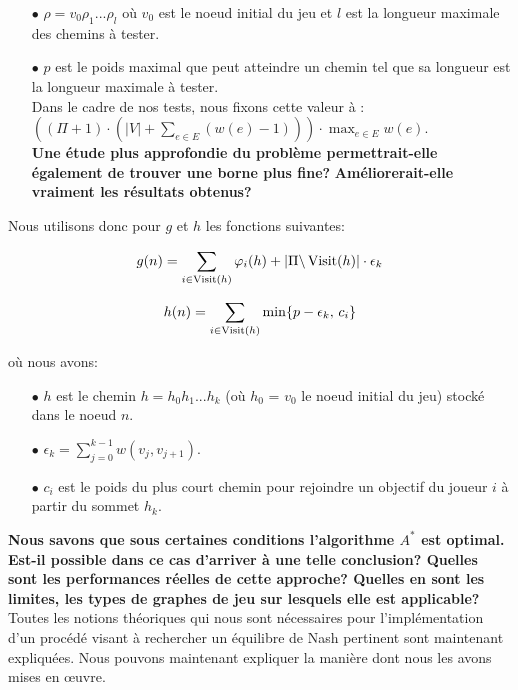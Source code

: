 \begin{itemize}
	\item[$\bullet$] $\rho = v_0 \rho_1 ... \rho_l$ où $v_0$ est le noeud initial du jeu et $l$ est la longueur maximale des chemins à tester.
	\item[$\bullet$] $p$ est le poids maximal que peut atteindre un chemin tel que sa longueur est la longueur maximale à tester.\\
	 Dans le cadre de nos tests, nous fixons cette valeur à : $((\Pi + 1) \cdot (|V| + \sum_{e \in E} (w(e) - 1)))\cdot \max_{e \in E} w(e)$.\\ \textbf{Une étude plus approfondie du problème permettrait-elle \linebreak également de trouver une borne plus fine?} \textbf{Améliorerait-elle vraiment les résultats obtenus?}\\
\end{itemize}

Nous utilisons donc pour $g$ et $h$ les fonctions suivantes:

$$ g(n) = \sum_{i \in \operatorname*{Visit}(h)} \varphi_i(h) + |\Pi\backslash \operatorname*{Visit}(h)| \cdot \epsilon_k$$



$$h(n) = \sum_{i \in \operatorname*{Visit}(h)} \min\{ p - \epsilon_k ,\, c_i \}$$


où nous avons:

\begin{itemize}
	\item[$\bullet$] $h$ est le chemin $h = h_0 h_1 ... h_k$ (où $h_0$ = $v_0$ le noeud initial du jeu) stocké dans le noeud $n$.
	\item[$\bullet$] $\displaystyle \epsilon_k = \sum_{j = 0}^{k-1} w(v_j, v_{j+1})$.
	\item[$\bullet$] $c_i$ est le poids du plus court chemin pour rejoindre un objectif du joueur $i$ à partir du sommet $h_k$.
\end{itemize}
$ $\\
\textbf{Nous savons que sous certaines conditions l'algorithme $A^*$ est optimal. Est-il possible dans ce cas d'arriver à une telle conclusion? Quelles sont les performances réelles de cette approche? Quelles en sont les limites, les types de graphes de jeu sur lesquels elle est applicable?}\\
	
	
	
Toutes les notions théoriques qui nous sont nécessaires pour l'implémentation d'un procédé visant à rechercher un équilibre de Nash pertinent sont maintenant expliquées. Nous pouvons maintenant expliquer la manière dont nous les avons mises en \oe uvre.










